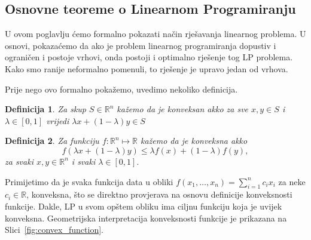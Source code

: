 \documentclass[a4paper, utf8, 11pt, colorlinks]{article}
\newtheorem{definition}{Definicija}
\begin{document}
\subsection{Osnovne teoreme o Linearnom Programiranju}
U ovom poglavlju ćemo formalno pokazati način rješavanja linearnog problema. U osnovi, pokazaćemo da ako je problem
linearnog programiranja dopustiv i ograničen i postoje vrhovi, onda postoji i optimalno rješenje tog LP problema. Kako smo ranije neformalno pomenuli,  to rješenje je upravo jedan od vrhova. 

Prije nego ovo formalno pokažemo, uvedimo nekoliko definicija. 

\begin{definition}
  Za skup $S \in \mathbb{R}^n$ kažemo da je konveksan akko za sve $x,y\in S$ i $\lambda\in [0, 1]$ vrijedi $\lambda x + (1 - \lambda)y \in S$
\end{definition}
\begin{definition}
   Za funkciju $f:\mathbb{R}^n \mapsto \mathbb{R}$ kažemo da je konveksna akko 
   $$ f( \lambda x + (1-\lambda) y) \leq \lambda f(x) + (1 -\lambda) f(y),$$
   za svaki $x,y \in \mathbb{R}^n$ i svaki $\lambda \in [0,1].$
\end{definition}
Primijetimo da je svaka funkcija data u obliki $f(x_1, \ldots, x_n) = \sum_{i=1}^n c_i x_i$ za neke $c_i \in \mathbb{R}$, konveksna, što se direktno provjerava na osnovu definicije konveksnosti funkcije. Dakle, LP u svom opštem obliku  ima ciljnu funkciju koja je uvijek konveksna. Geometrijska interpretacija konveksnosti funkcije je prikazana na Slici~\ref{fig:convex_function}.
\end{document}
